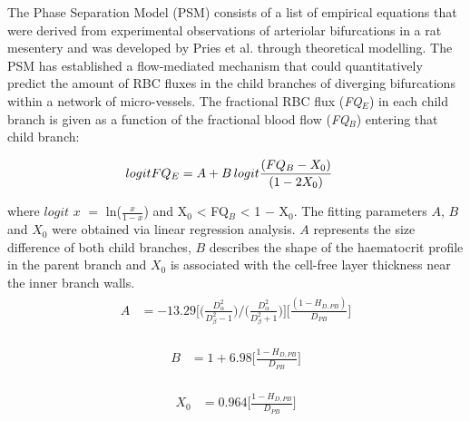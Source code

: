 \noindent The Phase Separation Model (PSM) consists of a list of empirical equations that were derived from experimental observations of arteriolar bifurcations in a rat mesentery and was developed by Pries et al.\cite{A.R.Pries2005Mbvi, PriesAR1990BFiM} through theoretical modelling. The PSM has established a flow-mediated mechanism that could quantitatively predict the amount of RBC fluxes in the child branches of diverging bifurcations within a network of micro-vessels. The fractional RBC flux (\textit{FQ$_{E}$}) in each child branch is given as a function of the fractional blood flow (\textit{FQ$_{B}$}) entering that child branch:

\begin{eqnarray}
\label{Pries_equation1}
\begin{aligned}
logit FQ_{E} & = A + B \thinspace logit \frac{(FQ_{B} - X_{0})}{(1 - 2X_{0})}
\end{aligned}
\end{eqnarray}

\bigskip

\noindent where $logit$ $x$ $=$ ln($\frac{x}{1-x}$) and X$_{0}$ < FQ$_{B}$ < 1 $-$ X$_{0}$. The fitting parameters $A$, $B$ and $X_{0}$ were obtained via linear regression analysis. $A$ represents the size difference of both child branches, $B$ describes the shape of the haematocrit profile in the parent branch and $X_{0}$ is associated with the cell-free layer thickness near the inner branch walls. \\

\begin{eqnarray}
\label{Pries_equationA}
\begin{aligned}
A & = -13.29\bigg[\bigg(\frac{D_{\alpha}^{2}}{D_{\beta}^{2} -1}\bigg) \bigg/ \bigg(\frac{D_{\alpha}^{2}}{D_{\beta}^{2} +1}\bigg)\bigg]\bigg[\frac{(1 - H_{D,PB})}{D_{PB}}\bigg]
\end{aligned}
\end{eqnarray}

\begin{eqnarray}
\label{Pries_equationB}
\begin{aligned}
B & = 1 + 6.98\bigg[\frac{1 - H_{D,PB}}{D_{PB}}\bigg]
\end{aligned}
\end{eqnarray}

\begin{eqnarray}
\label{Pries_equationX}
\begin{aligned}
X_{0} & = 0.964\bigg[\frac{1-H_{D,PB}}{D_{PB}}\bigg]
\end{aligned}
\end{eqnarray}

